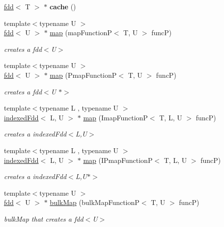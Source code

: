 \begin{DoxyCompactItemize}
\item 
\hypertarget{classfaster_1_1fdd_ac460ea12f02045a3d9203bb83eb5adb3}{}\label{classfaster_1_1fdd_ac460ea12f02045a3d9203bb83eb5adb3} 
\hyperlink{classfaster_1_1fdd}{fdd}$<$ T $>$ $\ast$ {\bfseries cache} ()
\item 
{\footnotesize template$<$typename U $>$ }\\\hyperlink{classfaster_1_1fdd}{fdd}$<$ U $>$ $\ast$ \hyperlink{group__map_ga214d07df3240baf348492f9a4186d5cc}{map} (map\+FunctionP$<$ T, U $>$ funcP)
\begin{DoxyCompactList}\small\item\em creates a fdd$<$\+U$>$ \end{DoxyCompactList}\item 
{\footnotesize template$<$typename U $>$ }\\\hyperlink{classfaster_1_1fdd}{fdd}$<$ U $>$ $\ast$ \hyperlink{group__map_ga2cfde53328f21d2ffba58dde111219ff}{map} (Pmap\+FunctionP$<$ T, U $>$ funcP)
\begin{DoxyCompactList}\small\item\em creates a fdd$<$\+U $\ast$$>$ \end{DoxyCompactList}\item 
{\footnotesize template$<$typename L , typename U $>$ }\\\hyperlink{classfaster_1_1indexedFdd}{indexed\+Fdd}$<$ L, U $>$ $\ast$ \hyperlink{group__map_ga17066a9f6526c2c630d730727c6b1b51}{map} (Imap\+FunctionP$<$ T, L, U $>$ funcP)
\begin{DoxyCompactList}\small\item\em creates a indexed\+Fdd$<$\+L,\+U$>$ \end{DoxyCompactList}\item 
{\footnotesize template$<$typename L , typename U $>$ }\\\hyperlink{classfaster_1_1indexedFdd}{indexed\+Fdd}$<$ L, U $>$ $\ast$ \hyperlink{group__map_ga61ce985503e31026794696c6c6db20b8}{map} (I\+Pmap\+FunctionP$<$ T, L, U $>$ funcP)
\begin{DoxyCompactList}\small\item\em creates a indexed\+Fdd$<$\+L,\+U$\ast$$>$ \end{DoxyCompactList}\item 
{\footnotesize template$<$typename U $>$ }\\\hyperlink{classfaster_1_1fdd}{fdd}$<$ U $>$ $\ast$ \hyperlink{group__bulk_ga0b4b82535fe1d2746973ce4e203d619f}{bulk\+Map} (bulk\+Map\+FunctionP$<$ T, U $>$ funcP)
\begin{DoxyCompactList}\small\item\em bulk\+Map that creates a fdd$<$\+U$>$ \end{DoxyCompactList}\item 

\end{DoxyCompactItemize}
